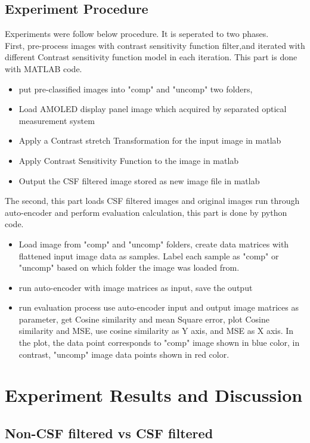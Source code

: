 \documentclass{article}
\begin{document}
\subsection{Experiment Procedure}
Experiments were follow below procedure. It is seperated to two phases.\\
First, pre-process images with contrast sensitivity function filter,and iterated with different Contrast sensitivity function model in each iteration. This part is done with MATLAB code.
\begin{itemize}
    \item put pre-classified images into "comp" and "uncomp" two folders, 
    \item Load AMOLED display panel image which acquired by separated optical measurement system
    \item Apply a Contrast stretch Transformation for the input image in matlab
    \item Apply Contrast Sensitivity Function to the image in matlab
    \item Output the CSF filtered image stored as new image file in matlab
\end{itemize}
The second, this part loads CSF filtered images and original images run through auto-encoder and perform evaluation calculation, this part is done by python code.
\begin{itemize}
    \item Load image from "comp" and "uncomp" folders, create data matrices with flattened input image data as samples. Label each sample as "comp" or "uncomp" based on which folder the image was loaded from.
    \item run auto-encoder with image matrices as input, save the output
    \item run evaluation process use auto-encoder input and output image matrices as parameter, get Cosine similarity and mean Square error, plot Cosine similarity and MSE, use cosine similarity as Y axis, and MSE as X axis. In the plot, the data point corresponds to "comp" image shown in blue color, in contrast, "uncomp" image data points shown in red color.   
\end{itemize}

\section{Experiment Results and Discussion}
\subsection{Non-CSF filtered vs CSF filtered}
\end{document}
